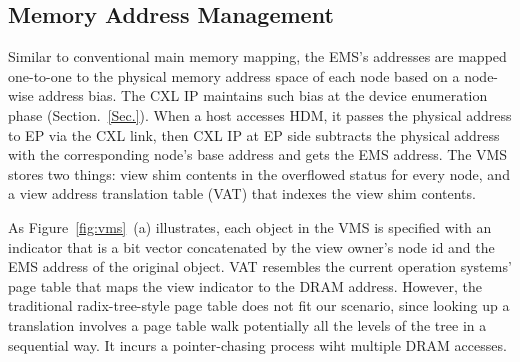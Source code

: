 








\ifx\stale\undefined

\subsection{Memory Address Management}

Similar to conventional main memory mapping, the EMS's addresses are mapped one-to-one to the physical memory address space of each node based on a node-wise address bias.
The CXL IP maintains such bias at the device enumeration phase (Section.~\ref{Sec.}). 
When a host accesses HDM, it passes the physical address to EP via the CXL link, then CXL IP at EP side subtracts the physical address with the corresponding node's base address and gets the EMS address. 
The VMS stores two things: view shim contents in the overflowed status for every node, and a view address translation table (VAT) that indexes the view shim contents. 

As Figure~\ref{fig:vms}~(a) illustrates, each object in the VMS is specified with an indicator that is a bit vector concatenated by the view owner's node id and the EMS address of the original object. VAT resembles the current operation systems' page table that maps the view indicator to the DRAM address. However, the traditional radix-tree-style page table does not fit our scenario, since looking up a translation involves a page table walk potentially all the levels of the tree in a sequential way. It incurs a pointer-chasing process wiht multiple DRAM accesses. 

